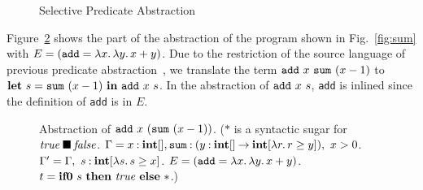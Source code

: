 \begin{figure}[t]
\begin{minipage}{\textwidth}
 {}

\medskip

 {}

%

\medskip

  {}
\end{minipage}
\caption{Selective Predicate Abstraction}
\label{fig:abstraction}
\end{figure}

Figure~\ref{fig:abst-example} shows the part of the abstraction of the
program shown in Fig.~\ref{fig:sum} with $E =
(\mathtt{add}=\lambda{x}.\,{\lambda{y}.\,{x+y}})$.  Due to the restriction of the
source language of previous predicate
abstraction~\cite{KobayashiPLDI2011}, we translate the term
${{\mathtt{add}}~{x}}~{{\mathtt{sum}}~{(x-1)}}$ to
$\mathbf{let}\ {s} = {{\mathtt{sum}}~{(x-1)}}\ \mathbf{in}\ {{{\mathtt{add}}~{x}}~{s}}$.
In the abstraction of ${{\mathtt{add}}~{x}}~{s}$, \texttt{add} is
inlined since the definition of \texttt{add} is in $E$.

\begin{figure}[t]

\caption{Abstraction of ${{\mathtt{add}}~{x}}~{({\mathtt{sum}}~{(x-1)})}$.
 ($*$ is a syntactic sugar for ${\mathit{true}}\mathbin{\blacksquare}{\mathit{false}}$.
  $\Gamma = x\mathbin{:}\mathbf{int}[], \mathtt{sum}\mathbin{:}({y\mathbin{:}\mathbf{int}[]}\mathbin{\rightarrow}{\mathbf{int}[\lambda{r}.\,{r \geq y}]}),~ x>0$.
  $\Gamma' = \Gamma,~s\mathbin{:}\mathbf{int}[\lambda{s}.\,{s \geq x}]$.
  $E = (\mathtt{add}=\lambda{x}.\,{\lambda{y}.\,{x+y}})$.
  $t = \mathbf{if0}~{s}~\mathbf{then}~{\mathit{true}}~\mathbf{else}~{*}$.)}
\label{fig:abst-example}
\end{figure}

